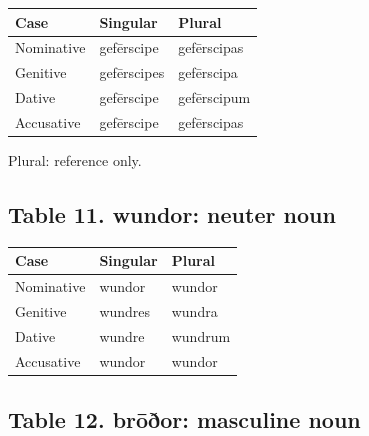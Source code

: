 \par\begingroup
\fontsize{10.5}{13.2}\selectfont
\setlength{\LTleft}{0pt}\setlength{\LTright}{\fill}
\noindent
\begin{tabular}{@{}>{\raggedright\arraybackslash}p{36.99mm}>{\raggedright\arraybackslash}p{40.69mm}>{\raggedright\arraybackslash}p{40.69mm}@{}}
\toprule
\textbf{Case} & \textbf{Singular} & \textbf{Plural} \\
\midrule
Nominative & gefērscipe & gefērscipas \\
Genitive & gefērscipes & gefērscipa \\
Dative & gefērscipe & gefērscipum \\
Accusative & gefērscipe & gefērscipas \\
\bottomrule
\end{tabular}
\par\endgroup

Plural: reference only.

\subsection*{Table 11. wundor: neuter noun}

\par\begingroup
\fontsize{10.5}{13.2}\selectfont
\setlength{\LTleft}{0pt}\setlength{\LTright}{\fill}
\noindent
\begin{tabular}{@{}>{\raggedright\arraybackslash}p{39.46mm}>{\raggedright\arraybackslash}p{39.46mm}>{\raggedright\arraybackslash}p{39.46mm}@{}}
\toprule
\textbf{Case} & \textbf{Singular} & \textbf{Plural} \\
\midrule
Nominative & wundor & wundor \\
Genitive & wundres & wundra \\
Dative & wundre & wundrum \\
Accusative & wundor & wundor \\
\bottomrule
\end{tabular}
\par\endgroup

\subsection*{Table 12. brōðor: masculine noun}

